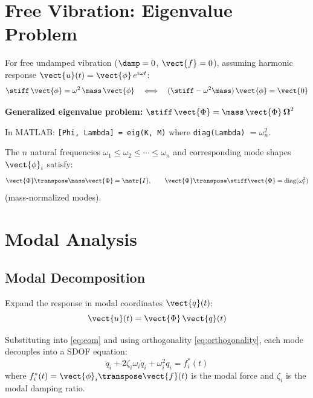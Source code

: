 \section{Free Vibration: Eigenvalue Problem}

For free undamped vibration ($\damp = 0$, $\vect{f} = 0$), assuming harmonic
response $\vect{u}(t) = \vect{\phi}\,e^{i\omega t}$:
\begin{equation}
    \stiff\,\vect{\phi} = \omega^2\,\mass\,\vect{\phi}
    \quad \Longleftrightarrow \quad
    (\stiff - \omega^2\mass)\,\vect{\phi} = \vect{0}
    \label{eq:eigenvalue}
\end{equation}

\begin{importantbox}
\textbf{Generalized eigenvalue problem:} $\stiff\,\vect{\Phi} = \mass\,\vect{\Phi}\,\boldsymbol{\Omega}^2$

\smallskip
In MATLAB: \texttt{[Phi, Lambda] = eig(K, M)}
where \texttt{diag(Lambda)} $= \omega_n^2$.
\end{importantbox}

The $n$ natural frequencies $\omega_1 \leq \omega_2 \leq \cdots \leq \omega_n$
and corresponding mode shapes $\vect{\phi}_i$ satisfy:
\begin{equation}
    \vect{\Phi}\transpose \mass \vect{\Phi} = \matr{I}, \qquad
    \vect{\Phi}\transpose \stiff \vect{\Phi} = \text{diag}(\omega_i^2)
    \label{eq:orthogonality}
\end{equation}
(mass-normalized modes).

\section{Modal Analysis}

\subsection{Modal Decomposition}

Expand the response in modal coordinates $\vect{q}(t)$:
\begin{equation}
    \vect{u}(t) = \vect{\Phi}\,\vect{q}(t)
    \label{eq:modal_expansion}
\end{equation}

Substituting into \cref{eq:eom} and using orthogonality \cref{eq:orthogonality},
each mode decouples into a SDOF equation:
\begin{equation}
    \ddot{q}_i + 2\zeta_i\omega_i\dot{q}_i + \omega_i^2 q_i = f_i^*(t)
    \label{eq:modal_eom}
\end{equation}
where $f_i^*(t) = \vect{\phi}_i\transpose \vect{f}(t)$ is the modal force and
$\zeta_i$ is the modal damping ratio.

